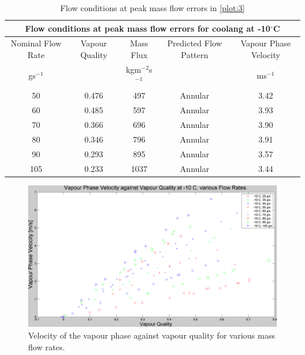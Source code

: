 \documentclass{report}
\begin{document}
\begin{table}[h]
\centering
\begin{tabular}{|c|c|c|c|c|}
\hline
\multicolumn{5}{|c|}{\textbf{Flow conditions at peak mass flow errors for coolang at -10$^\circ$C}}\\\hline
Nominal Flow Rate & Vapour Quality & Mass Flux & Predicted Flow Pattern & Vapour Phase Velocity \\\hline
gs$^{-1}$ &  & kgm$^{-2}$s$^{-1}$ & & ms$^{-1}$\\\hline
50 &0.476 & 497 & Annular & 3.42 \\\hline
60 &0.485 & 597 & Annular & 3.93 \\\hline
70 &0.366 & 696 & Annular & 3.90 \\\hline
80 &0.346 & 796 & Annular & 3.91 \\\hline
90 &0.293 & 895 & Annular & 3.57 \\\hline
105 & 0.233 & 1037 & Annular & 3.44 \\\hline
\end{tabular}
\caption{Flow conditions at peak mass flow errors in \ref{plot:3}}
\label{tab:flowConditions}
\end{table}

\begin{figure}[h]
\includegraphics[width=\textwidth]{plots/fig12}
\caption{Velocity of the vapour phase against vapour quality for various mass flow rates.}
\label{gasVelocity}
\end{figure}

\FloatBarrier
\end{document}
